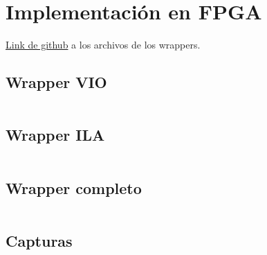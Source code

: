 \section{Implementación en FPGA}

\href{https://github.com/msebgarcia/DDA2024/tree/main/Lab01/wrapper}{Link de github} a los archivos de los wrappers.

\subsection{Wrapper VIO}
\inputminted[fontsize=\footnotesize]{systemverilog}{../wrapper/vio_wrapper.v}

\newpage
\subsection{Wrapper ILA}
\inputminted[fontsize=\footnotesize]{systemverilog}{../wrapper/ila_wrapper.v}

\newpage
\subsection{Wrapper completo}
\inputminted[fontsize=\footnotesize]{systemverilog}{../wrapper/shiftleds_wrapper.sv}

\newpage
\subsection{Capturas}

